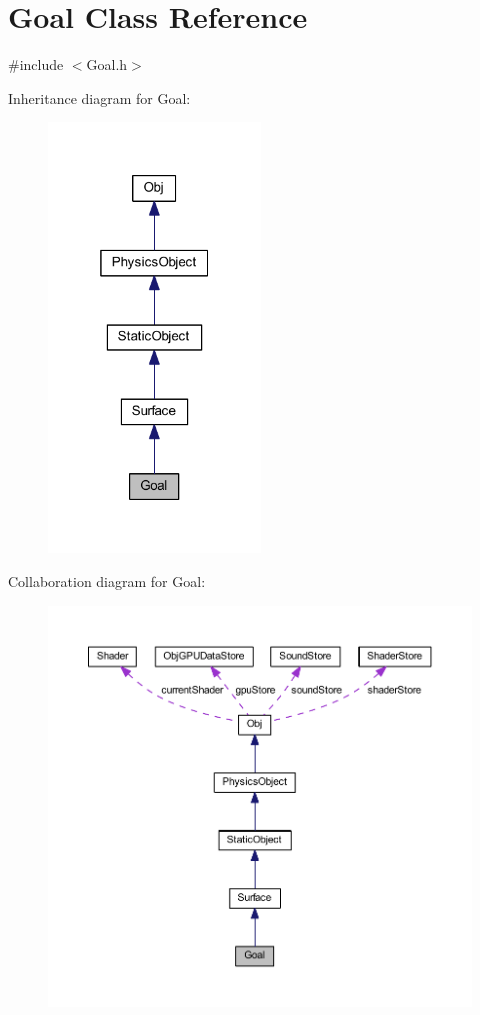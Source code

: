 \hypertarget{class_goal}{}\section{Goal Class Reference}
\label{class_goal}


{\ttfamily \#include $<$Goal.\+h$>$}



Inheritance diagram for Goal\+:
\nopagebreak
\begin{figure}[H]
\begin{center}
\leavevmode
\includegraphics[width=160pt]{class_goal__inherit__graph}
\end{center}
\end{figure}


Collaboration diagram for Goal\+:
\nopagebreak
\begin{figure}[H]
\begin{center}
\leavevmode
\includegraphics[width=350pt]{class_goal__coll__graph}
\end{center}
\end{figure}
